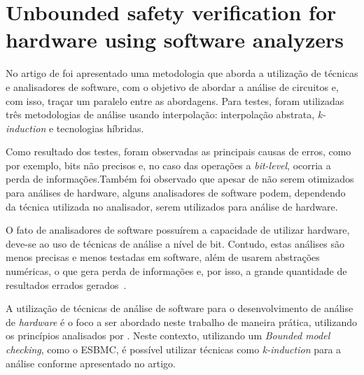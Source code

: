 \section{Unbounded safety verification for hardware using software analyzers}
No artigo de  foi apresentado uma metodologia que aborda a utilização de técnicas e analisadores de software, com o objetivo de abordar a análise de circuitos e, com isso, traçar um paralelo entre as abordagens. Para testes, foram utilizadas três metodologias de análise usando interpolação:\cite{beyer2011cpachecker} interpolação abstrata\cite{blanchet2003static}, \textit{k-induction}\cite{donaldson2011software} e tecnologias híbridas. 

\par
Como resultado dos testes, foram observadas as principais causas de erros, como por exemplo, bits não precisos e, no caso das operações a \textit{bit-level}, ocorria a perda de informações.Também foi observado que apesar de não serem otimizados para análises de hardware, alguns analisadores de software podem, dependendo da técnica utilizada no analisador, serem utilizados para análise de hardware\cite{mukherjee2016unbounded}.

\par
O fato de analisadores de software possuírem a capacidade de utilizar hardware, deve-se ao uso de técnicas de análise a nível de bit. Contudo, estas análises são menos precisas e menos testadas em software, além de usarem abstrações numéricas, o que gera perda de informações e, por isso, a grande quantidade de resultados errados gerados~\cite{mukherjee2016unbounded}.

\par
A utilização de técnicas de análise de software para o desenvolvimento de análise de \textit{hardware} é o foco a ser abordado neste trabalho de maneira prática, utilizando os princípios analisados por \cite{mukherjee2016unbounded}. Neste contexto, utilizando um \textit{Bounded model checking}, como o ESBMC, é possível utilizar técnicas como \textit{k-induction} para a análise conforme apresentado no artigo.

